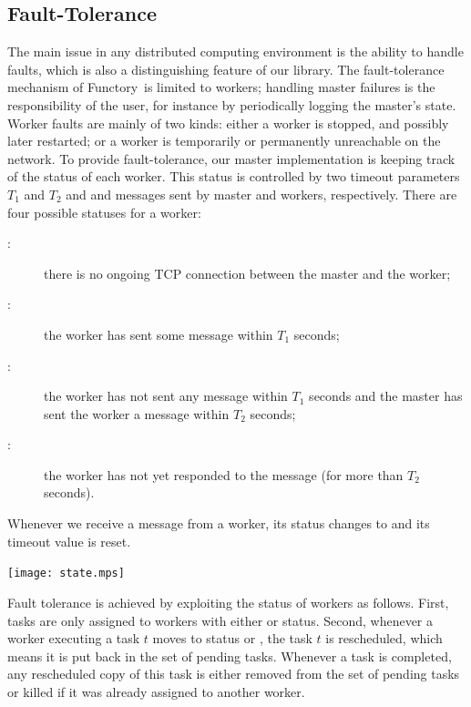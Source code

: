 \documentclass{llncs}
\newcommand{\functory}{\textsf{Functory}}
\begin{document}
\subsection{Fault-Tolerance}\label{sec:fault}

The main issue in any distributed computing environment is the ability
to handle faults, which is also a distinguishing feature of our
library.  
The fault-tolerance mechanism of \functory\ is limited to workers;
handling master failures is the responsibility of the user, for
instance by periodically logging the master's state.
Worker faults are mainly of two kinds: either a worker is stopped,
and possibly later restarted; or a worker is temporarily or
permanently unreachable on the network. To provide fault-tolerance,
our master implementation is keeping track of the status of each
worker.  This status is controlled by two timeout parameters $T_1$ and
$T_2$ and  and  messages sent by master and workers,
respectively. There are four possible statuses for a worker:
\begin{description}
\item[:] there is no ongoing TCP connection between
  the master and the worker;
\item[:] the worker has sent some message
  within $T_1$ seconds;
\item[:] the worker has not sent any message within $T_1$
  seconds and the master has sent the worker a
   message within $T_2$ seconds;
\item[:] the worker has not yet responded to the 
  message (for more than $T_2$ seconds).
\end{description}
Whenever we receive a message from a worker, its status changes to
 and its timeout value is reset.
\begin{center}
  \texttt{[image: state.mps]}
\end{center}

Fault tolerance is achieved by exploiting the status of workers as
follows. First, tasks are only assigned to workers with either
 or  status. Second, whenever a worker executing
a task $t$ moves to status  or , the
task $t$ is rescheduled, which means it is put back in the set of
pending tasks. Whenever a task is completed, any rescheduled copy of
this task is either removed from the set of pending tasks or killed if
it was already assigned to another worker.
\end{document}
